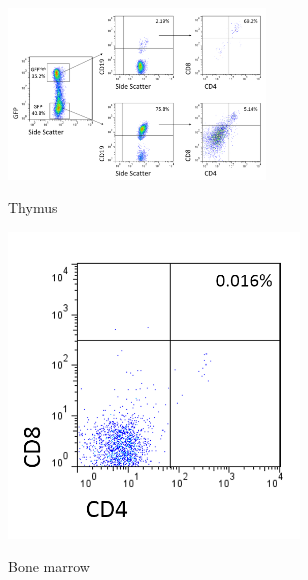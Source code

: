   
\begin{figure}	
	\begin{subfigure}{\textwidth}
	\centering
	\caption{Thymus}
	\includegraphics[width=0.75\textwidth]{Figures/GFPCD19CD4CD8.png}	
	\label{subfig:ThyRAGCD19DP}
	\end{subfigure}
	\begin{subfigure}{0.25\textwidth}
	\centering
	\caption{Bone marrow}
	\includegraphics[width=0.85\textwidth]{Figures/BMallposGFPpos.png}	
	\label{subfig:BMRAGCD19DP}
	\end{subfigure}
	\hfill
	\begin{subfigure}{0.25\textwidth}

\end{subfigure}
\end{figure}
